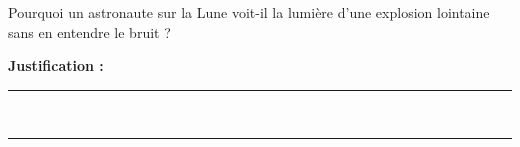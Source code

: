 Pourquoi un astronaute sur la Lune voit-il la lumière d'une explosion lointaine sans en entendre le bruit ?

\choices

\noindent\textbf{Justification :} \hrulefill \\[2.5ex]
\rule{\linewidth}{0.4pt} \\[2.5ex]
\rule{\linewidth}{0.4pt}
\vfill

